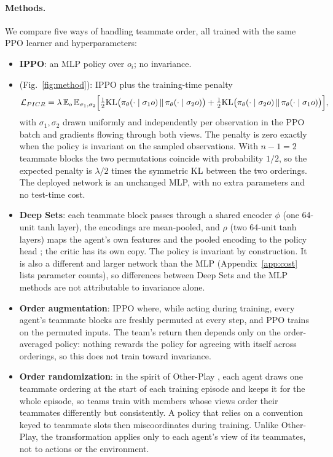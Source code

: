 \paragraph{Methods.}
We compare five ways of handling teammate order, all trained with the same PPO
learner and hyperparameters:
\begin{itemize}[leftmargin=1.3em,itemsep=1pt,topsep=2pt]
\item \textbf{IPPO}: an MLP policy over $o_i$; no invariance.
\item \textbf{\picr} (Fig.~\ref{fig:method}): IPPO plus the training-time penalty
\begin{equation}
\mathcal{L}_{PICR} = \lambda\, \mathbb{E}_{o}\, \mathbb{E}_{\sigma_1,\sigma_2}
\Big[\tfrac12 \mathrm{KL}\big(\pi_\theta(\cdot\mid\sigma_1 o)\,\|\,\pi_\theta(\cdot\mid\sigma_2 o)\big)
   + \tfrac12 \mathrm{KL}\big(\pi_\theta(\cdot\mid\sigma_2 o)\,\|\,\pi_\theta(\cdot\mid\sigma_1 o)\big)\Big],
\end{equation}
with $\sigma_1, \sigma_2$ drawn uniformly and independently per observation in
the PPO batch and gradients flowing through both views. The penalty is zero
exactly when the policy is invariant on the sampled observations. With $n-1=2$
teammate blocks the two permutations coincide with probability $1/2$, so the
expected penalty is $\lambda/2$ times the symmetric KL between the two
orderings. The deployed network is an unchanged MLP, with no extra parameters
and no test-time cost.
\item \textbf{Deep Sets}: each teammate block passes through a shared encoder
$\phi$ (one 64-unit tanh layer), the encodings are mean-pooled, and $\rho$ (two
64-unit tanh layers) maps the agent's own features and the pooled encoding to
the policy head \citep{zaheer2017deepsets}; the critic has its own copy. The
policy is invariant by construction. It is also a different and larger network
than the MLP (Appendix~\ref{app:cost} lists parameter counts), so differences
between Deep Sets and the MLP methods are not attributable to invariance alone.
\item \textbf{Order augmentation}: IPPO where, while acting during training,
every agent's teammate blocks are freshly permuted at every step, and PPO
trains on the permuted inputs. The team's return then depends only on the
order-averaged policy: nothing rewards the policy for agreeing with itself
across orderings, so this does not train toward invariance.
\item \textbf{Order randomization}: in the spirit of Other-Play
\citep{hu2020otherplay}, each agent draws one teammate ordering at the start of
each training episode and keeps it for the whole episode, so teams train with
members whose views order their teammates differently but consistently. A
policy that relies on a convention keyed to teammate slots then miscoordinates
during training. Unlike Other-Play, the transformation applies only to each
agent's view of its teammates, not to actions or the environment.
\end{itemize}
